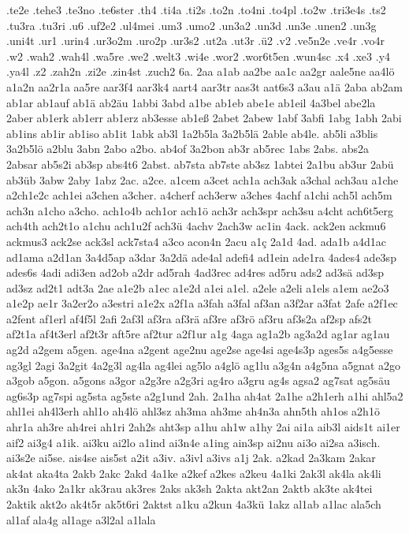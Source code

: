 {.te2e
.tehe3
.te3no
.te6ster
.th4
.ti4a
.ti2s
.to2n
.to4ni
.to4pl
.to2w
.tri3e4s
.ts2
.tu3ra
.tu3ri
.u6
.uf2e2
.ul4mei
.um3
.umo2
.un3a2
.un3d
.un3e
.unen2
.un3g
.uni4t
.ur1
.urin4
.ur3o2m
.uro2p
.ur3s2
.ut2a
.ut3r
.ü2
.v2
.ve5n2e
.ve4r
.vo4r
.w2
.wah2
.wah4l
.wa5re
.we2
.welt3
.wi4e
.wor2
.wor6t5en
.wun4sc
.x4
.xe3
.y4
.ya4l
.z2
.zah2n
.zi2e
.zin4st
.zuch2
6a.
2aa
a1ab
aa2be
aa1c
aa2gr
aale5ne
aa4lö
a1a2n
aa2r1a
aa5re
aar3f4
aar3k4
aart4
aar3tr
aas3t
aat6s3
a3au
a1ä
2aba
ab2am
ab1ar
ab1auf
ab1ä
ab2äu
1abbi
3abd
a1be
ab1eb
abe1e
ab1eil
4a3bel
abe2la
2aber
ab1erk
ab1err
ab1erz
ab3esse
ab1eß
2abet
2abew
1abf
3abfi
1abg
1abh
2abi
ab1ins
ab1ir
ab1iso
ab1it
1abk
ab3l
1a2b5la
3a2b5lä
2able
ab4le.
ab5li
a3blis
3a2b5lö
a2blu
3abn
2abo
a2bo.
ab4of
3a2bon
ab3r
ab5rec
1abs
2abs.
abs2a
2absar
ab5s2i
ab3sp
abs4t6
2abst.
ab7sta
ab7ste
ab3sz
1abtei
2a1bu
ab3ur
2abü
ab3üb
3abw
2aby
1abz
2ac.
a2ce.
a1cem
a3cet
ach1a
ach3ak
a3chal
ach3au
a1che
a2ch1e2c
ach1ei
a3chen
a3cher.
a4cherf
ach3erw
a3ches
4achf
a1chi
ach5l
ach5m
ach3n
a1cho
a3cho.
ach1o4b
ach1or
ach1ö
ach3r
ach3spr
ach3su
a4cht
ach6t5erg
ach4th
ach2t1o
a1chu
ach1u2f
ach3ü
4achv
2ach3w
ac1in
4ack.
ack2en
ackmu6
ackmus3
ack2se
ack3sl
ack7sta4
a3co
acon4n
2acu
a1ç
2a1d
4ad.
ada1b
a4d1ac
ad1ama
a2d1an
3a4d5ap
a3dar
3a2dä
ade4al
adefi4
ad1ein
ade1ra
4ades4
ade3sp
ades6s
4adi
adi3en
ad2ob
a2dr
ad5rah
4ad3rec
ad4res
ad5ru
ads2
ad3sä
ad3sp
ad3sz
ad2t1
adt3a
2ae
a1e2b
a1ec
a1e2d
a1ei
a1el.
a2ele
a2eli
a1els
a1em
ae2o3
a1e2p
ae1r
3a2er2o
a3estri
a1e2x
a2f1a
a3fah
a3fal
af3an
a3f2ar
a3fat
2afe
a2f1ec
a2fent
af1erl
af4f5l
2afi
2af3l
af3ra
af3rä
af3re
af3rö
af3ru
af3s2a
af2sp
afs2t
af2t1a
af4t3erl
af2t3r
aft5re
af2tur
a2f1ur
a1g
4aga
ag1a2b
ag3a2d
ag1ar
ag1au
ag2d
a2gem
a5gen.
age4na
a2gent
age2nu
age2se
age4si
age4s3p
ages5s
a4g5esse
ag3gl
2agi
3a2git
4a2g3l
ag4la
ag4lei
ag5lo
a4glö
ag1lu
a3g4n
a4g5na
a5gnat
a2go
a3gob
a5gon.
a5gons
a3gor
a2g3re
a2g3ri
ag4ro
a3gru
ag4s
agsa2
ag7sat
ag5säu
ag6s3p
ag7spi
ag5sta
ag5ste
a2g1und
2ah.
2a1ha
ah4at
2a1he
a2h1erh
a1hi
ahl5a2
ahl1ei
ah4l3erh
ahl1o
ah4lö
ahl3sz
ah3ma
ah3me
ah4n3a
ahn5th
ah1os
a2h1ö
ahr1a
ah3re
ah4rei
ah1ri
2ah2s
aht3sp
a1hu
ah1w
a1hy
2ai
ai1a
aib3l
aids1t
ai1er
aif2
ai3g4
a1ik.
ai3ku
ai2lo
a1ind
ai3n4e
a1ing
ain3sp
ai2nu
ai3o
ai2sa
a3isch.
ai3s2e
ai5se.
ais4se
ais5st
a2it
a3iv.
a3ivl
a3ivs
a1j
2ak.
a2kad
2a3kam
2akar
ak4at
aka4ta
2akb
2akc
2akd
4a1ke
a2kef
a2kes
a2keu
4a1ki
2ak3l
ak4la
ak4li
ak3n
4ako
2a1kr
ak3rau
ak3res
2aks
ak3sh
2akta
akt2an
2aktb
ak3te
ak4tei
2aktik
akt2o
ak4t5r
ak5t6ri
2aktst
a1ku
a2kun
4a3kü
1akz
al1ab
a1lac
ala5ch
al1af
ala4g
al1age
a3l2al
a1lala
}
